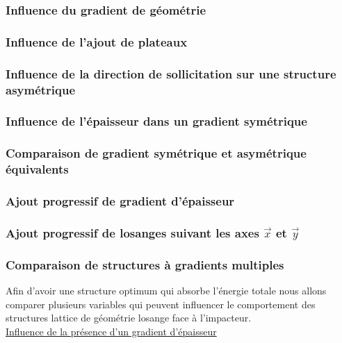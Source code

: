 \documentclass[a4paper]{article}
\begin{document}
	\subsubsection{Influence du gradient de géométrie}
	
	\subsubsection{Influence de l'ajout de plateaux}
	
	\subsubsection{Influence de la direction de sollicitation sur une structure asymétrique}
	
	\subsubsection{Influence de l'épaisseur dans un gradient symétrique}
	
	\subsubsection{Comparaison de gradient symétrique et asymétrique équivalents}
	
	\subsubsection{Ajout progressif de gradient d'épaisseur}
	
	\subsubsection{Ajout progressif de losanges suivant les axes $\vec{x}$ et $\vec{y}$}
	
	\subsubsection{Comparaison de structures à gradients multiples}
	
	\hspace{0.5cm}Afin d'avoir une structure optimum qui absorbe l’énergie totale nous allons comparer plusieurs variables qui peuvent influencer le comportement des structures lattice de géométrie losange face à l’impacteur.\\
	
	\underline{Influence de la présence d'un gradient d'épaisseur}\\
	
\end{document}
